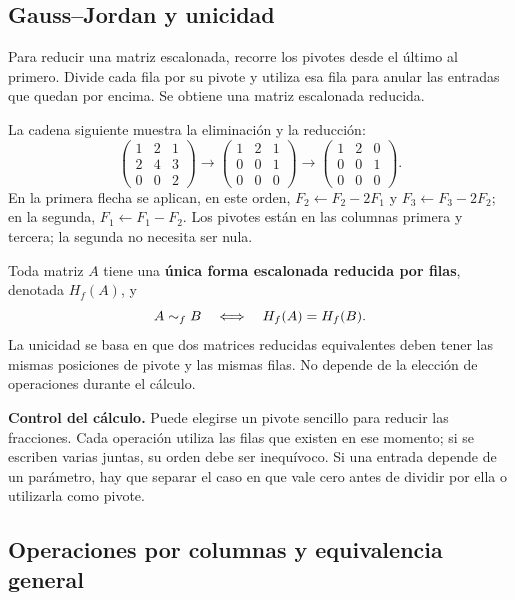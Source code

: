 \subsection*{Gauss--Jordan y unicidad}

Para reducir una matriz escalonada, recorre los pivotes desde el último
al primero. Divide cada fila por su pivote y utiliza esa fila para anular
las entradas que quedan por encima. Se obtiene una matriz escalonada reducida.

\begin{ejemplo}
La cadena siguiente muestra la eliminación y la reducción:
\[
 \begin{pmatrix}1&2&1\\2&4&3\\0&0&2\end{pmatrix}
 \longrightarrow
 \begin{pmatrix}1&2&1\\0&0&1\\0&0&0\end{pmatrix}
 \longrightarrow
 \begin{pmatrix}1&2&0\\0&0&1\\0&0&0\end{pmatrix}.
\]
En la primera flecha se aplican, en este orden,
$F_2\leftarrow F_2-2F_1$ y $F_3\leftarrow F_3-2F_2$;
en la segunda, $F_1\leftarrow F_1-F_2$. Los pivotes están en las columnas
primera y tercera; la segunda no necesita ser nula.
\end{ejemplo}

Toda matriz $A$ tiene una \textbf{única forma escalonada reducida por filas},
denotada $H_f(A)$, y
\[
 A\sim_f B\quad\Longleftrightarrow\quad H_f(A)=H_f(B).
\]
La unicidad se basa en que dos matrices reducidas equivalentes deben
tener las mismas posiciones de pivote y las mismas filas. No depende
de la elección de operaciones durante el cálculo.

\textbf{Control del cálculo.} Puede elegirse un pivote sencillo para reducir
las fracciones. Cada operación utiliza las filas que existen en ese momento;
si se escriben varias juntas, su orden debe ser inequívoco. Si una entrada
depende de un parámetro, hay que separar el caso en que vale cero antes
de dividir por ella o utilizarla como pivote.

\subsection*{Operaciones por columnas y equivalencia general}


